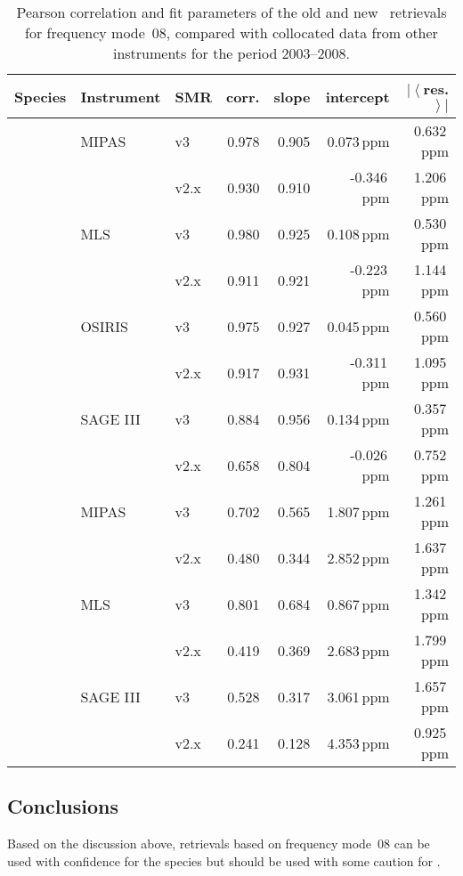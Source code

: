 \begin{table}[hbt]
\centering
\caption{Pearson correlation and fit parameters of the old and new \smr\
retrievals for frequency mode~08, compared with collocated data from other
instruments for the period 2003--2008.
}
\label{tab:fm08:stats}
\begin{tabular}{lllrrrr}
    \toprule
    \textbf{Species} & \textbf{Instrument} & \textbf{SMR} & \textbf{corr.} & \textbf{slope} & \textbf{intercept} & \textbf{$\left|\left<\right.\right.$res.$\left.\left.\right>\right|$} \\
    \midrule
    \chem{O3}   & MIPAS     & v3    & 0.978 & 0.905 & 0.073\,ppm    & 0.632\,ppm \\
                &           & v2.x  & 0.930 & 0.910 & -0.346\,ppm   & 1.206\,ppm \\
    \cline{2-7}
                & MLS       & v3    & 0.980 & 0.925 & 0.108\,ppm    & 0.530\,ppm \\
                &           & v2.x  & 0.911 & 0.921 & -0.223\,ppm   & 1.144\,ppm \\
    \cline{2-7}
                & OSIRIS    & v3    & 0.975 & 0.927 & 0.045\,ppm    & 0.560\,ppm \\
                &           & v2.x  & 0.917 & 0.931 & -0.311\,ppm   & 1.095\,ppm \\
    \cline{2-7}
                & SAGE III  & v3    & 0.884 & 0.956 & 0.134\,ppm    & 0.357\,ppm \\
                &           & v2.x  & 0.658 & 0.804 & -0.026\,ppm   & 0.752\,ppm \\
    \midrule
    \chem{H_2O} & MIPAS     & v3    & 0.702 & 0.565 & 1.807\,ppm    & 1.261\,ppm \\
                &           & v2.x  & 0.480 & 0.344 & 2.852\,ppm    & 1.637\,ppm \\
    \cline{2-7}
                & MLS       & v3    & 0.801 & 0.684 & 0.867\,ppm    & 1.342\,ppm \\
                &           & v2.x  & 0.419 & 0.369 & 2.683\,ppm    & 1.799\,ppm \\
    \cline{2-7}
                & SAGE III  & v3    & 0.528 & 0.317 & 3.061\,ppm    & 1.657\,ppm \\
                &           & v2.x  & 0.241 & 0.128 & 4.353\,ppm    & 0.925\,ppm \\
    \bottomrule
\end{tabular}
\end{table}

\subsection{Conclusions}
\label{sec:fm08:conclusions}
Based on the discussion above, retrievals based on frequency mode~08 can be
used with confidence for the species \chem{O_3} but should be used with some
caution for \chem{H_2O}.
